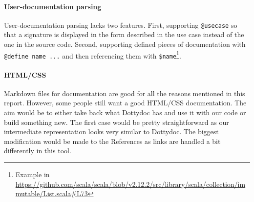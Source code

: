 \documentclass{report}
\begin{document}
\paragraph{User-documentation parsing}
User-documentation parsing lacks two features. First, supporting \texttt{@usecase} so that a signature is displayed in the form described in the use case instead of the one in the source code. Second, supporting defined pieces of documentation with \texttt{@define name ...} and then referencing them with \texttt{\$name}\footnote{Example in \url{https://github.com/scala/scala/blob/v2.12.2/src/library/scala/collection/immutable/List.scala\#L73}}.

\paragraph{HTML/CSS}
Markdown files for documentation are good for all the reasons mentioned in this report. However, some people still want a good HTML/CSS documentation. The aim would be to either take back what Dottydoc has and use it with our code or build something new. The first case would be pretty straightforward as our intermediate representation looks very similar to Dottydoc. The biggest modification would be made to the References as links are handled a bit differently in this tool.
\end{document}
